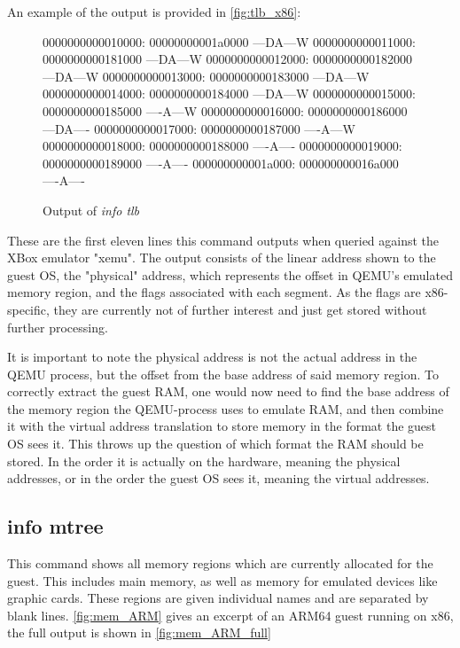 An example of the output is provided in \autoref{fig:tlb_x86}:

\begin{figure}[H]
\begin{ffcode}
    0000000000010000: 00000000001a0000 ---DA---W
    0000000000011000: 0000000000181000 ---DA---W
    0000000000012000: 0000000000182000 ---DA---W
    0000000000013000: 0000000000183000 ---DA---W
    0000000000014000: 0000000000184000 ---DA---W
    0000000000015000: 0000000000185000 ----A---W
    0000000000016000: 0000000000186000 ---DA----
    0000000000017000: 0000000000187000 ----A---W
    0000000000018000: 0000000000188000 ----A----
    0000000000019000: 0000000000189000 ----A----
    000000000001a000: 000000000016a000 ----A----
\end{ffcode}
\caption{Output of \emph{info tlb}}
\label{fig:tlb_x86}
\end{figure}

These are the first eleven lines this command outputs when queried against the XBox emulator "xemu"\cite{xemu}.
The output consists of the linear address shown to the guest OS, the "physical" address, which represents the offset in QEMU's emulated memory region,
and the flags associated with each segment.
As the flags are x86-specific, they are currently not of further interest and just get stored without further processing.

It is important to note the physical address is not the actual address in the QEMU process, but the offset from the base address of said memory region.
To correctly extract the guest RAM, one would now need to find the base address of the memory region the QEMU-process uses to emulate RAM,
and then combine it with the virtual address translation to store memory in the format the guest OS sees it.
This throws up the question of which format the RAM should be stored. In the order it is actually on the hardware, meaning the physical addresses,
or in the order the guest OS sees it, meaning the virtual addresses.

\subsection{info mtree}\label{sec:API_mtree}
This command shows all memory regions which are currently allocated for the guest.
This includes main memory, as well as memory for emulated devices like graphic cards.
These regions are given individual names and are separated by blank lines.
\autoref{fig:mem_ARM} gives an excerpt of an ARM64 guest running on x86,
the full output is shown in \autoref{fig:mem_ARM_full}

